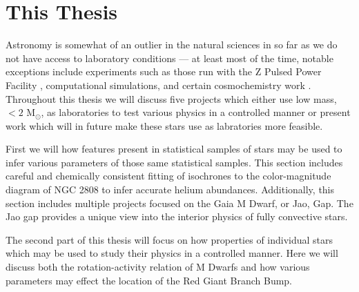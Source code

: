 \section{This Thesis}
Astronomy is somewhat of an outlier in the natural sciences in so far as we do
not have access to laboratory conditions --- at least most of the time, notable
exceptions include experiments such as those run with the Z Pulsed Power
Facility \citep[e.g.][]{Falcon2013}, computational simulations, and certain
cosmochemistry work \citep[e.g.][]{MacPherson2011}. Throughout this thesis we
will discuss five projects which either use low mass, $< 2$ M$_{\odot}$, as
laboratories to test various physics in a controlled manner or present work
which will in future make these stars use as labratories more feasible.

First we will how features present in statistical samples of stars may be used
to infer various parameters of those same statistical samples. This section
includes careful and chemically consistent fitting of isochrones to the
color-magnitude diagram of NGC 2808 to infer accurate helium abundances.
Additionally, this section includes multiple projects focused on the Gaia M
Dwarf, or Jao, Gap. The Jao gap provides a unique view into the interior
physics of fully convective stars.

The second part of this thesis will focus on how properties of individual stars
which may be used to study their physics in a controlled manner. Here we will
discuss both the rotation-activity relation of M Dwarfs and how various
parameters may effect the location of the Red Giant Branch Bump. 
